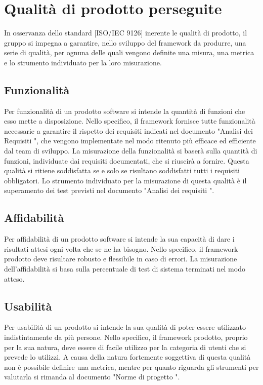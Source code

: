 
\section{Qualità di prodotto perseguite}
	In osservanza dello standard [ISO/IEC 9126] inerente le qualità di prodotto, il gruppo \groupname si impegna a garantire, nello sviluppo del framework da produrre, una serie di qualità, per ognuna delle quali vengono definite una misura, una metrica e lo strumento individuato per la loro misurazione.
	\subsection{Funzionalità}
		Per funzionalità di un prodotto software si intende la quantità di funzioni che esso mette a disposizione.
		Nello specifico, il framework fornisce tutte funzionalità necessarie a garantire il rispetto dei requisiti indicati nel documento "Analisi dei Requisiti \lastversion", che vengono implementate nel modo ritenuto più efficace ed efficiente dal team di sviluppo.
		La misurazione della funzionalità si baserà sulla quantità di funzioni, individuate dai requisiti documentati, che si riuscirà a fornire. 
		Questa qualità si ritiene soddisfatta se e solo se risultano soddisfatti tutti i requisiti obbligatori.
		Lo strumento individuato per la misurazione di questa qualità è il superamento dei test previsti nel documento "Analisi dei requisiti \lastversion".
	\subsection{Affidabilità}
		Per affidabilità di un prodotto software si intende la sua capacità di dare i risultati attesi ogni volta che se ne ha bisogno.
		Nello specifico, il framework prodotto deve risultare robusto e flessibile in caso di errori.
		La misurazione dell'affidabilità si basa sulla percentuale di test di sistema terminati nel modo atteso.
	\subsection{Usabilità}
		Per usabilità di un prodotto si intende la sua qualità di poter essere utilizzato indistintamente da più persone.
		Nello specifico, il framework prodotto, proprio per la sua natura, deve essere di facile utilizzo per la categoria di utenti che si prevede lo utilizzi.
		A causa della natura fortemente soggettiva di questa qualità non è possibile definire una metrica, mentre per quanto riguarda gli strumenti per valutarla si rimanda al documento "Norme di progetto \lastversion".
